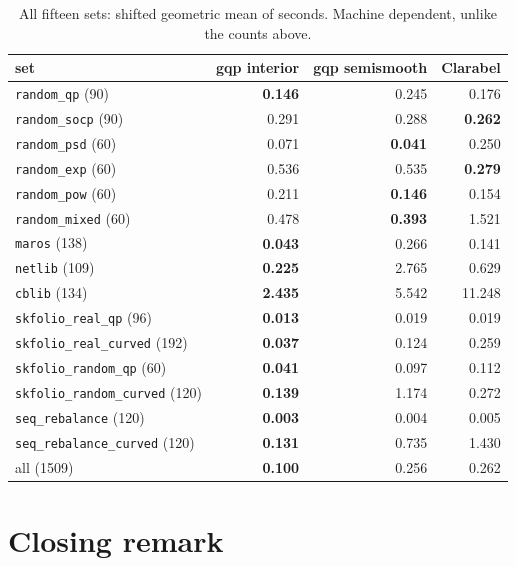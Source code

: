 \documentclass[a4paper,11pt]{book}
\theoremstyle{plain}
\theoremstyle{definition}
\theoremstyle{remark}
\numberwithin{equation}{chapter}
\numberwithin{algorithm}{chapter}
\begin{document}
	\begin{table}[H]
		\centering\small
		\begin{tabular}{lrrr}
			\toprule
			set & gqp interior & gqp semismooth & Clarabel\\
			\midrule
			\texttt{random\_qp} (90)             & \textbf{0.146} & 0.245 & 0.176\\
			\texttt{random\_socp} (90)           & 0.291 & 0.288 & \textbf{0.262}\\
			\texttt{random\_psd} (60)            & 0.071 & \textbf{0.041} & 0.250\\
			\texttt{random\_exp} (60)            & 0.536 & 0.535 & \textbf{0.279}\\
			\texttt{random\_pow} (60)            & 0.211 & \textbf{0.146} & 0.154\\
			\texttt{random\_mixed} (60)          & 0.478 & \textbf{0.393} & 1.521\\
			\texttt{maros} (138)                 & \textbf{0.043} & 0.266 & 0.141\\
			\texttt{netlib} (109)                & \textbf{0.225} & 2.765 & 0.629\\
			\texttt{cblib} (134)                 & \textbf{2.435} & 5.542 & 11.248\\
			\texttt{skfolio\_real\_qp} (96)      & \textbf{0.013} & 0.019 & 0.019\\
			\texttt{skfolio\_real\_curved} (192) & \textbf{0.037} & 0.124 & 0.259\\
			\texttt{skfolio\_random\_qp} (60)    & \textbf{0.041} & 0.097 & 0.112\\
			\texttt{skfolio\_random\_curved} (120) & \textbf{0.139} & 1.174 & 0.272\\
			\texttt{seq\_rebalance} (120)        & \textbf{0.003} & 0.004 & 0.005\\
			\texttt{seq\_rebalance\_curved} (120) & \textbf{0.131} & 0.735 & 1.430\\
			\midrule
			all (1509)                           & \textbf{0.100} & 0.256 & 0.262\\
			\bottomrule
		\end{tabular}
		\caption{All fifteen sets: shifted geometric mean of seconds. Machine
			dependent, unlike the counts above.}
	\end{table}




	\chapter{Closing remark}
	
\end{document}
